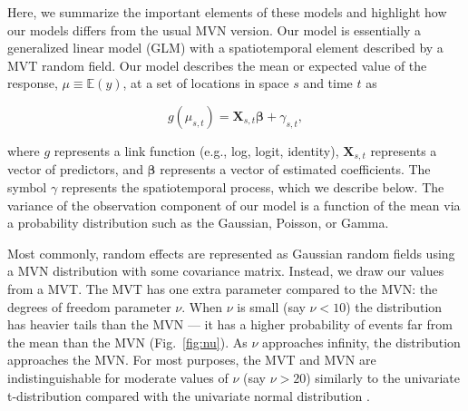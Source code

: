 \documentclass[12pt,english]{article}
\begin{document}
\begin{spacing}{1.25}
Here, we summarize the important elements of these models and
highlight how our models differs from the usual MVN version. Our model is
essentially a generalized linear model (GLM) with a spatiotemporal element
described by a MVT random field. Our model describes the mean or expected value
of the response, $\mu \equiv \mathbb{E}(y)$, at a set of locations in space $s$
and time $t$ as

\begin{equation}
  g(\mu_{s,t}) = \bm{X}_{s,t} \bm{\beta} + \gamma_{s,t},
\end{equation}

\noindent where $g$ represents a link function (e.g., log, logit, identity),
$\bm{X}_{s,t}$ represents a vector of predictors, and $\bm{\beta}$ represents a
vector of estimated coefficients.
The symbol $\gamma$ represents the spatiotemporal process,
which we describe below.
The variance of the observation component of
our model is a function of the mean via a
probability distribution such as the Gaussian, Poisson, or Gamma.

Most commonly, random effects are represented as Gaussian random fields using a
MVN distribution with some covariance matrix. Instead, we draw our values from
a MVT. The MVT has one extra parameter compared to the MVN: the degrees of
freedom parameter $\nu$. When $\nu$ is small (say $\nu < 10$) the distribution
has heavier tails than the MVN --- it has a higher probability of events far
from the mean than the MVN (Fig.~\ref{fig:nu}). As $\nu$ approaches infinity,
the distribution approaches the MVN. For most purposes, the MVT and MVN are
indistinguishable for moderate values of $\nu$ (say $\nu > 20$) similarly to
the univariate t-distribution compared with the univariate normal distribution
\citep[e.g.,][]{anderson2017}.


\end{spacing}
\end{document}
